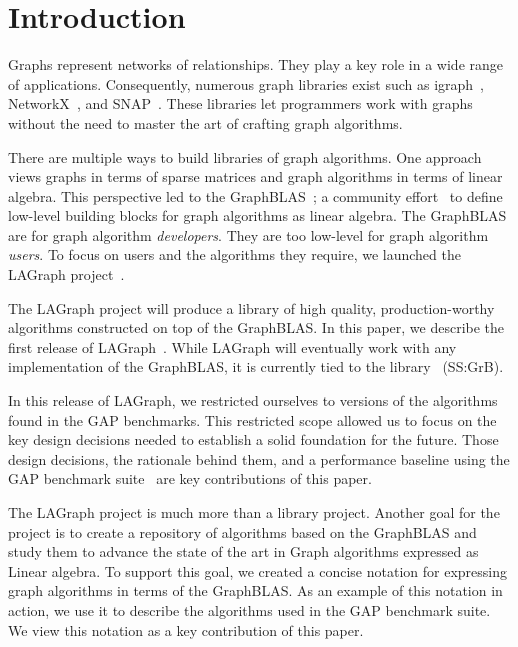 \section{Introduction}
\label{sec:introduction}

Graphs represent networks of relationships. They play a key role in 
a wide range of applications.   Consequently, numerous graph libraries exist 
such as igraph~\cite{igraph}, NetworkX~\cite{DBLP:reference/snam/X18xv}, and SNAP~\cite{DBLP:journals/tist/LeskovecS16}.
These libraries let programmers work with graphs without the need to master the art of crafting graph algorithms.

There are multiple ways to build libraries of graph algorithms.  One approach
views graphs in terms of sparse matrices and graph algorithms in terms of 
linear algebra. This perspective led to the 
GraphBLAS~\cite{DBLP:conf/hpec/MattsonBBBDFFGGHKLLPPRSWY13,DBLP:conf/hpec/MattsonYMBM17}; 
a community effort~\cite{GraphBLASforum} to define low-level building blocks for graph algorithms as linear algebra.
The GraphBLAS are for graph algorithm \emph{developers}.  They are too 
low-level for graph algorithm \emph{users}.  To focus on users and the 
algorithms they require, we launched the
LAGraph project~\cite{DBLP:conf/ipps/MattsonDKBMMY19}.  

The LAGraph project will produce a library 
of high quality, production-worthy algorithms constructed on top of
the GraphBLAS.  In this paper, we describe the first release of LAGraph~\cite{LAGraphRepo}.
While LAGraph will eventually work with any implementation of the GraphBLAS, it is currently tied to
the \ssgrb library~\cite{SuiteSparseGraphBLAS} (SS:GrB).

In this release of LAGraph, we restricted ourselves to versions of the algorithms found in the GAP benchmarks.
This restricted scope allowed us to focus on the key design decisions needed to establish a solid
foundation for the future.  Those design decisions, the rationale behind them, and a performance baseline 
using the GAP benchmark suite~\cite{DBLP:journals/corr/BeamerAP15} are key contributions of this paper.   

The LAGraph project is much more than a library project.   Another goal for the project is to 
create a repository of algorithms based on the GraphBLAS and study them to advance the state of the art in 
Graph algorithms expressed as Linear algebra. To support this goal, we created a concise notation for expressing
graph algorithms in terms of the GraphBLAS.   As an example of this notation in action, we use it to describe 
the algorithms used in the GAP benchmark suite.  We view this notation as a key contribution of this paper.  


